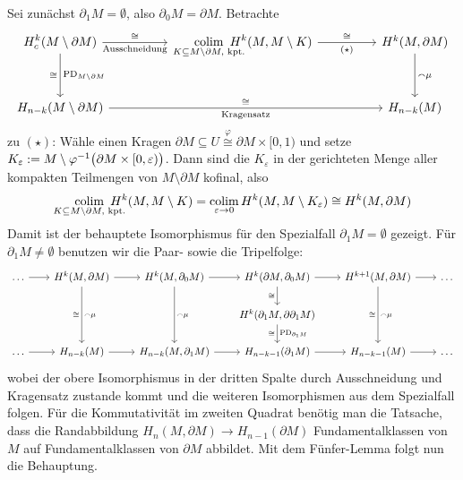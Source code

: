 \begin{beweis}
	Sei zunächst $\partial_1 M = \emptyset$, also $\partial _0 M = \partial M$.
	Betrachte 
	\[
		\begin{tikzcd}[column sep=4.7em, row sep=2.8em]
			\displaystyle H_c^k \enbrace*{M \setminus\partial M} \rar["\cong","\text{Ausschneidung}"'] \dar["\PD_{M \setminus \partial M}","\cong"'] 
			& \displaystyle\smashoperator[r]{\colim_{K \subseteq M \setminus \partial M,\text{ kpt.} }}\,\, H^k(M, M \setminus K)  \rar["\cong","(\star)"'] & H^k(M, \partial M) \dar["\capp \mu"] \\
			H_{n-k}\enbrace*{M\setminus \partial M}\ar[rr,"\cong","\text{Kragensatz}"'] && H_{n-k}(M)
		\end{tikzcd}
	\]
	zu $(\star)$: Wähle einen Kragen $\partial M \subseteq U \overset{\varphi}{\cong} \partial M \times [0,1)$ und setze $K_\varepsilon := M \setminus \varphi^{-1} \enbrace[\big]{\partial M \times [0,\varepsilon)}$.
	Dann sind die $K_\varepsilon$ in der gerichteten Menge aller kompakten Teilmengen von $M \setminus \partial M$ kofinal, also 
	\[
		\smashoperator[r]{\colim_{K \subseteq M \setminus \partial M,\text{ kpt.} }}\,\, H^k(M, M \setminus K) = \colim_{\varepsilon\to 0} H^k(M,M \setminus K_\varepsilon) \cong H^k(M, \partial M) 
	\]
	Damit ist der behauptete Isomorphismus für den Spezialfall $\partial_1 M = \emptyset$ gezeigt.
	Für $\partial_1 M \neq \emptyset$ benutzen wir die Paar- sowie die Tripelfolge:
	\[
		\begin{tikzcd}[column sep=2em]
			\ldots \rar & H^k(M, \partial M) \rar \ar[dd,"\capp \mu","\cong"'] & H^k(M,\partial_0 M) \rar \ar[dd,"\capp \mu"]& H^k(\partial M,\partial_0 M) \rar  \dar["\cong"'] & H^{k+1}(M,\partial M) \ar[dd,"\capp \mu","\cong"'] \rar&\ldots  \\
			& & & H^k \enbrace*{\partial_1 M, \partial \partial_1 M} \dar["\PD_{\partial_1 M}","\cong"'] \\
			\ldots \rar & H_{n-k}(M) \rar & H_{n-k}(M,\partial_1 M) \rar & H_{n-k-1}(\partial_1 M) \rar & H_{n-k-1}(M) \rar &\ldots 
		\end{tikzcd}
	\]
	wobei der obere Isomorphismus in der dritten Spalte durch Ausschneidung und Kragensatz zustande kommt und die weiteren Isomorphismen aus dem Spezialfall folgen.
	Für die Kommutativität im zweiten Quadrat benötig man die Tatsache, dass die Randabbildung $H_n(M,\partial M) \to H_{n-1}(\partial M)$ Fundamentalklassen von $M$ auf Fundamentalklassen von $\partial M$ abbildet.
	Mit dem Fünfer-Lemma folgt nun die Behauptung.
\end{beweis}
\newpage

